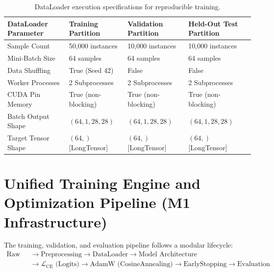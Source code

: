 \documentclass[11pt, a4paper]{article}
\begin{document}
\begin{table}[H]
  \centering
  \caption{DataLoader execution specifications for reproducible training.}
  \label{tab:dataloader_specs}
  \small
  \begin{tabularx}{\textwidth}{@{}p{3.8cm} Y Y Y@{}}
    \toprule
    \textbf{DataLoader Parameter} & \textbf{Training Partition} & \textbf{Validation Partition} & \textbf{Held-Out Test Partition} \\
    \midrule
    Sample Count & 50,000 instances & 10,000 instances & 10,000 instances \\
    Mini-Batch Size & 64 samples & 64 samples & 64 samples \\
    Data Shuffling & True (Seed 42) & False & False \\
    Worker Processes & 2 Subprocesses & 2 Subprocesses & 2 Subprocesses \\
    CUDA Pin Memory & True (non-blocking) & True (non-blocking) & True (non-blocking) \\
    Batch Output Shape & $(64, 1, 28, 28)$ & $(64, 1, 28, 28)$ & $(64, 1, 28, 28)$ \\
    Target Tensor Shape & $(64,)$ [LongTensor] & $(64,)$ [LongTensor] & $(64,)$ [LongTensor] \\
    \bottomrule
  \end{tabularx}
\end{table}

\section{Unified Training Engine and Optimization Pipeline (M1 Infrastructure)}
\label{sec:pipeline}

The training, validation, and evaluation pipeline follows a modular lifecycle:
\begin{equation}
  \begin{aligned}
    \boxed{\text{Raw Data}} &\to \boxed{\text{Preprocessing}} \to \boxed{\text{DataLoader}} \to \boxed{\text{Model Architecture}} \\
    &\to \boxed{\mathcal{L}_{\text{CE}} \text{ (Logits)}} \to \boxed{\text{AdamW (CosineAnnealing)}} \to \boxed{\text{EarlyStopping}} \to \boxed{\text{Evaluation}}
  \end{aligned}
\end{equation}
\end{document}
